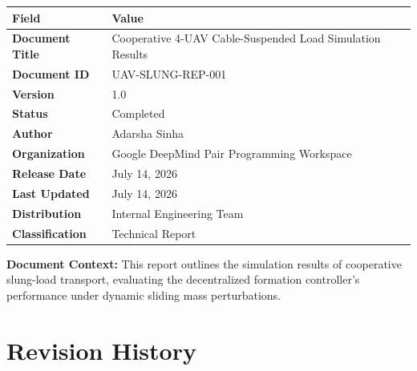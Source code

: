 \documentclass[11pt,a4paper]{article}
\begin{document}
\begin{table}[H]
    \renewcommand{\arraystretch}{1.5}
    \begin{tabularx}{\textwidth}{@{}lX@{}}
        \toprule
        \textbf{Field} & \textbf{Value} \\
        \midrule
        \textbf{Document Title} & Cooperative 4-UAV Cable-Suspended Load Simulation Results \\
        \textbf{Document ID}    & UAV-SLUNG-REP-001 \\
        \textbf{Version}        & 1.0 \\
        \textbf{Status}         & Completed \\
        \midrule
        \textbf{Author}         & Adarsha Sinha \\
        \textbf{Organization}   & Google DeepMind Pair Programming Workspace \\
        \midrule
        \textbf{Release Date}   & July 14, 2026 \\
        \textbf{Last Updated}   & July 14, 2026 \\
        \midrule
        \textbf{Distribution}   & Internal Engineering Team \\
        \textbf{Classification} & Technical Report \\
        \bottomrule
    \end{tabularx}
\end{table}

\vspace{1cm}

\begin{notebox}
    \textbf{Document Context:} This report outlines the simulation results of cooperative slung-load transport, evaluating the decentralized formation controller's performance under dynamic sliding mass perturbations.
\end{notebox}

\newpage
\section*{Revision History}
\end{document}
